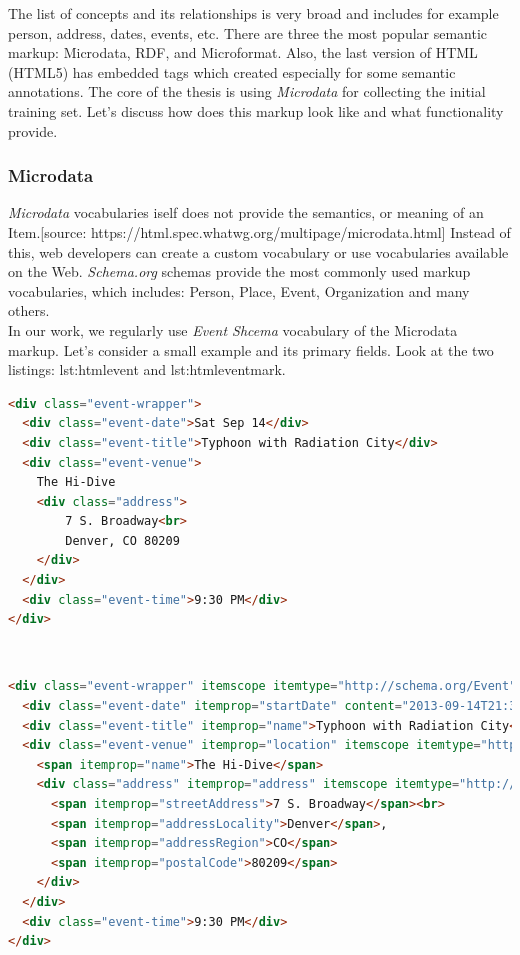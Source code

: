 The list of concepts and its relationships is very broad and includes for example person, address, dates, events, etc. There are three the most popular semantic markup: Microdata, RDF, and Microformat. Also, the last version of HTML (HTML5) has embedded tags which created especially for some semantic annotations. The core of the thesis is using \textit{Microdata} for collecting the initial training set. Let's discuss how does this markup look like and what functionality provide.\\

\subsubsection*{Microdata}
\textit{Microdata} vocabularies iself does not provide the semantics, or meaning of an Item.[source: https://html.spec.whatwg.org/multipage/microdata.html] Instead of this, web developers can create a custom vocabulary or use vocabularies available on the Web. \textit{Schema.org} schemas provide the most commonly used markup vocabularies, which includes: Person, Place, Event, Organization and many others. \\

In our work, we regularly use \textit{Event Shcema} vocabulary of the Microdata markup. Let's consider a small example and its primary fields. Look at the two listings: {lst:htmlevent} and {lst:htmleventmark}.\\

\begin{lstlisting}[language=html, caption={Event information without semantic markup}, label={lst:htmlevent}, captionpos=b]
<div class="event-wrapper">
  <div class="event-date">Sat Sep 14</div>
  <div class="event-title">Typhoon with Radiation City</div>
  <div class="event-venue">
    The Hi-Dive
    <div class="address">
        7 S. Broadway<br>
        Denver, CO 80209
    </div>
  </div>
  <div class="event-time">9:30 PM</div>
</div>

\end{lstlisting}
\\

\begin{lstlisting}[language=html, caption={Event information annotated with Microdata}, label={lst:htmleventmark}, captionpos=b]
<div class="event-wrapper" itemscope itemtype="http://schema.org/Event">
  <div class="event-date" itemprop="startDate" content="2013-09-14T21:30">Sat Sep 14</div>
  <div class="event-title" itemprop="name">Typhoon with Radiation City</div>
  <div class="event-venue" itemprop="location" itemscope itemtype="http://schema.org/Place">
    <span itemprop="name">The Hi-Dive</span>
    <div class="address" itemprop="address" itemscope itemtype="http://schema.org/PostalAddress">
      <span itemprop="streetAddress">7 S. Broadway</span><br>
      <span itemprop="addressLocality">Denver</span>,
      <span itemprop="addressRegion">CO</span>
      <span itemprop="postalCode">80209</span>
    </div>
  </div>
  <div class="event-time">9:30 PM</div>
</div>

\end{lstlisting}\\


